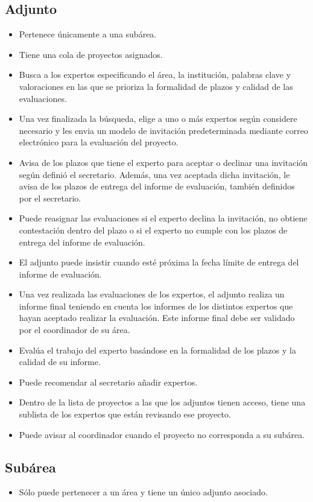 \documentclass[12pt,a4paper,titlepage,spanish,twoside]{book}
\begin{document}
\subsection{Adjunto}
\begin{itemize}
\item Pertenece únicamente a una subárea.
\item Tiene una cola de proyectos asignados.
\item Busca a los expertos especificando el área, la institución, palabras
  clave y valoraciones en las que se prioriza la formalidad de plazos y
  calidad de las evaluaciones. 
\item Una vez finalizada la búsqueda, elige a uno o más expertos según
  considere necesario y les envia un modelo de invitación predeterminada
  mediante correo electrónico para la  evaluación del proyecto.  
\item Avisa de los plazos que tiene el experto para aceptar o declinar una
  invitación según definió el secretario. Además, una vez aceptada dicha
  invitación, le avisa de los plazos de entrega del informe de evaluación,
  también definidos por el secretario. 
\item Puede reasignar las evaluaciones si el experto declina la invitación,
  no obtiene contestación dentro del plazo o si el experto no cumple con los
  plazos de entrega del informe de evaluación.
\item El adjunto puede insistir cuando esté próxima la fecha límite de
  entrega del informe de evaluación. 
\item Una vez realizada las evaluaciones de los expertos, el adjunto
  realiza un informe final teniendo en cuenta los informes de los distintos
  expertos que hayan aceptado realizar la evaluación. Este informe final
  debe ser validado por el coordinador de su área. 
\item Evalúa el trabajo del experto basándose en la formalidad de los plazos
  y la calidad de su informe. 
\item Puede recomendar al secretario añadir expertos.
\item Dentro de la lista de proyectos a las que los adjuntos tienen acceso,
  tiene una sublista de los expertos que están revisando ese proyecto. 
\item Puede avisar al coordinador cuando el proyecto no corresponda a su
  subárea. 
\end{itemize}

\subsection{Subárea}
\begin{itemize}
\item Sólo puede pertenecer a un área y tiene un único adjunto asociado.
\end{itemize}
\end{document}

